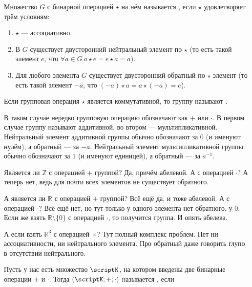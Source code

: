 \documentclass{article}
\begin{document}
\begin{itemize}
        \dfn Множество $G$ с бинарной операцией $\star$ на нём называется , если $\star$ удовлетворяет трём условиям:
        \begin{enumerate}[1)]
            \item $\star$ --- ассоциативно.
            \item В $G$ существует двусторонний нейтральный элемент по $\star$ (то есть такой элемент $e$, что $\forall a\in G~a\star e=e\star a=a$).
            \item Для любого элемента $G$ существует двусторонний обратный по $\star$ элемент (то есть такой элемент $-a$, что $(-a)\star a=a\star(-a)=e$).
        \end{enumerate}
        \dfn Если групповая операция $\star$ является коммутативной, то группу называют .
        \begin{Comment}
            В таком случае нередко групповую операцию обозначают как $+$ или $\cdot$. В первом случае группу называют аддитивной, во втором --- мультипликативной.\\
            Нейтральный элемент аддитивной группы обычно обозначают за $0$ (и именуют нулём), а обратный --- за $-a$. Нейтральный элемент мультипликативной группы обычно обозначают за $1$ (и именуют единицей), а обратный --- за $a^{-1}$.
        \end{Comment}
        \begin{Example}
            Является ли $\mathbb Z$ с операцией $+$ группой? Да, причём абелевой. А с операцией $\cdot$? А теперь нет, ведь для почти всех элементов не существует обратного.
        \end{Example}
        \begin{Example}
            А является ли $\mathbb R$ с операцией $+$ группой? Всё ещё да, и тоже абелевой. А с операцией $\cdot$? Всё ещё нет, но тут только у одного элемента нет обратного, у $0$. Если же взять $\mathbb R\setminus\{0\}$ с операцией $\cdot$, то получится группа. И опять абелева.
        \end{Example}
        \begin{Example}
            А если взять $\mathbb R^3$ с операцией $\times$? Тут полный комплекс проблем. Нет ни ассоциативности, ни нейтрального элемента. Про обратный даже говорить глупо в отсутствии нейтрального.
        \end{Example}
        \dfn Пусть у нас есть множество $\scriptK$, на котором введены две бинарные операции $+$ и $\cdot$. Тогда $(\scriptK;+;\cdot)$ называется , если

\end{itemize}
\end{document}
